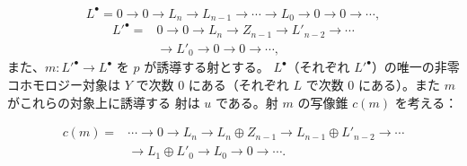 \[
L^\bullet=0\longrightarrow0\longrightarrow L_n\longrightarrow L_{n-1}
\longrightarrow\cdots\longrightarrow L_0\longrightarrow0
\longrightarrow0\longrightarrow\cdots ,
\]
\[
\begin{aligned}
{L'}^\bullet={}&0\longrightarrow0\longrightarrow L_n
\longrightarrow Z_{n-1}\longrightarrow L'_{n-2}
\longrightarrow\cdots\\
&\longrightarrow L'_0\longrightarrow0\longrightarrow0
\longrightarrow\cdots ,
\end{aligned}
\]
また、$m\colon {L'}^\bullet\longrightarrow L^\bullet$ を $p$ が誘導する射とする。
$L^\bullet$（それぞれ ${L'}^\bullet$）の唯一の非零コホモロジー対象は $Y$ で次数
$0$ にある（それぞれ $L$ で次数 $0$ にある）。また $m$ がこれらの対象上に誘導する
射は $u$ である。射 $m$ の写像錐 $c(m)$ を考える：

\[
\begin{aligned}
c(m)={}&\cdots\longrightarrow0\longrightarrow L_n
\longrightarrow L_n\oplus Z_{n-1}
\longrightarrow L_{n-1}\oplus L'_{n-2}\longrightarrow\cdots\\
&\longrightarrow L_1\oplus L'_0\longrightarrow L_0
\longrightarrow0\longrightarrow\cdots.
\end{aligned}
\]
\endgroup
